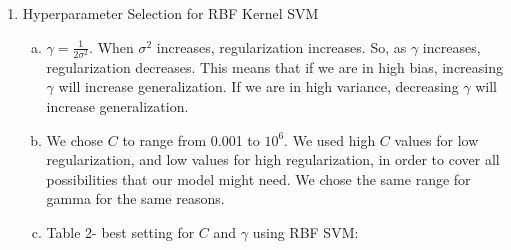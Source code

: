 \documentclass[11pt]{article}
\begin{document}
\begin{enumerate}
\begin{enumerate}
\end{enumerate}
\item Hyperparameter Selection for RBF Kernel SVM
\begin{enumerate}[(a)]
\item $\gamma = \frac{1}{2\sigma^2}$. When $\sigma^2$ increases, regularization increases. So, as $\gamma$
increases, regularization decreases. This means that if we are in high bias, increasing $\gamma$ will 
increase generalization. If we are in high variance, decreasing $\gamma$ will increase generalization. 
\item We chose $C$ to range from 0.001 to $10^6$. We used high $C$ values for low regularization, and 
low values for high regularization, in order to cover all possibilities that our model might need. We chose
the same range for gamma for the same reasons. 
\item Table 2- best setting for $C$ and $\gamma$ using RBF SVM: \\


\end{enumerate}
\end{enumerate}
\end{document}
